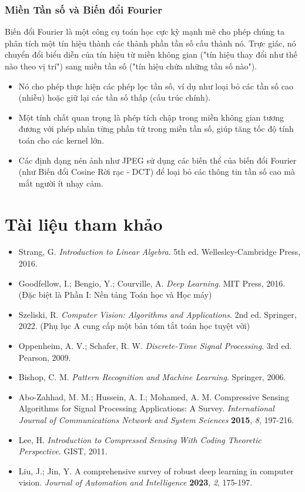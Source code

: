 \subsubsection{Miền Tần số và Biến đổi Fourier}
Biến đổi Fourier là một công cụ toán học cực kỳ mạnh mẽ cho phép chúng ta phân tích một tín hiệu thành các thành phần tần số cấu thành nó. Trực giác, nó chuyển đổi biểu diễn của tín hiệu từ miền không gian ("tín hiệu thay đổi như thế nào theo vị trí") sang miền tần số ("tín hiệu chứa những tần số nào").
\begin{itemize}
    \item Nó cho phép thực hiện các phép lọc tần số, ví dụ như loại bỏ các tần số cao (nhiễu) hoặc giữ lại các tần số thấp (cấu trúc chính).
    \item Một tính chất quan trọng là phép tích chập trong miền không gian tương đương với phép nhân từng phần tử trong miền tần số, giúp tăng tốc độ tính toán cho các kernel lớn.
    \item Các định dạng nén ảnh như JPEG sử dụng các biến thể của biến đổi Fourier (như Biến đổi Cosine Rời rạc - DCT) để loại bỏ các thông tin tần số cao mà mắt người ít nhạy cảm.
\end{itemize}

\section*{Tài liệu tham khảo}
\begin{itemize}
    \item[1] Strang, G. \textit{Introduction to Linear Algebra}. 5th ed. Wellesley-Cambridge Press, 2016.
    \item[2] Goodfellow, I.; Bengio, Y.; Courville, A. \textit{Deep Learning}. MIT Press, 2016. (Đặc biệt là Phần I: Nền tảng Toán học và Học máy)
    \item[3] Szeliski, R. \textit{Computer Vision: Algorithms and Applications}. 2nd ed. Springer, 2022. (Phụ lục A cung cấp một bản tóm tắt toán học tuyệt vời)
    \item[4] Oppenheim, A. V.; Schafer, R. W. \textit{Discrete-Time Signal Processing}. 3rd ed. Pearson, 2009.
    \item[5] Bishop, C. M. \textit{Pattern Recognition and Machine Learning}. Springer, 2006.
    \item[6] Abo-Zahhad, M. M.; Hussein, A. I.; Mohamed, A. M. Compressive Sensing Algorithms for Signal Processing Applications: A Survey. \textit{International Journal of Communications Network and System Sciences} \textbf{2015}, \textit{8}, 197-216.
    \item[7] Lee, H. \textit{Introduction to Compressed Sensing With Coding Theoretic Perspective}. GIST, 2011.
    \item[8] Liu, J.; Jin, Y. A comprehensive survey of robust deep learning in computer vision. \textit{Journal of Automation and Intelligence} \textbf{2023}, \textit{2}, 175-197.
\end{itemize}